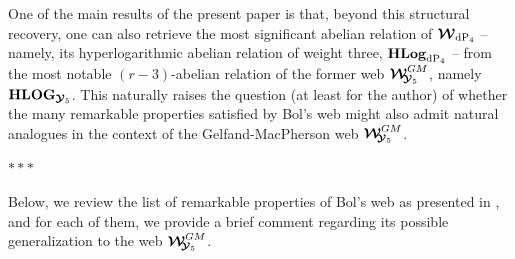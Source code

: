 \documentclass[11pt]{amsart}
\newcommand{\sk}{\smallskip}
\begin{document}
 One of the main results of the present paper is that, beyond this structural recovery, one can also retrieve the most significant abelian relation of 
$\boldsymbol{\mathcal W}_{ {\rm dP}_4}$ 
 -- namely, its hyperlogarithmic abelian relation of weight three, ${\bf HLog}_{\mathrm{dP}_4}$ -- from the most notable $(r - 3)$-abelian relation of the former web $\boldsymbol{\mathcal W}_{\hspace{-0.1cm} \boldsymbol{\mathcal Y}_5}^{GM}$, namely ${\bf HLOG}_{\boldsymbol{\mathcal Y}_5}$. This naturally raises the question (at least for the author) of whether the many remarkable properties satisfied by Bol's web might also admit natural analogues in the context of the Gelfand-MacPherson web $\boldsymbol{\mathcal W}_{\hspace{-0.1cm} \boldsymbol{\mathcal Y}_5}^{GM}$.
 \begin{center}
 $***$
 \end{center}
 
 Below, we review the list of remarkable properties of Bol's web as presented in \cite[\S1.1]{PirioAFST}, and for each of them, we provide a brief comment regarding its possible generalization to the web $\boldsymbol{\mathcal W}_{\hspace{-0.1cm} \boldsymbol{\mathcal Y}_5}^{GM}$. 
\sk


\end{document}
